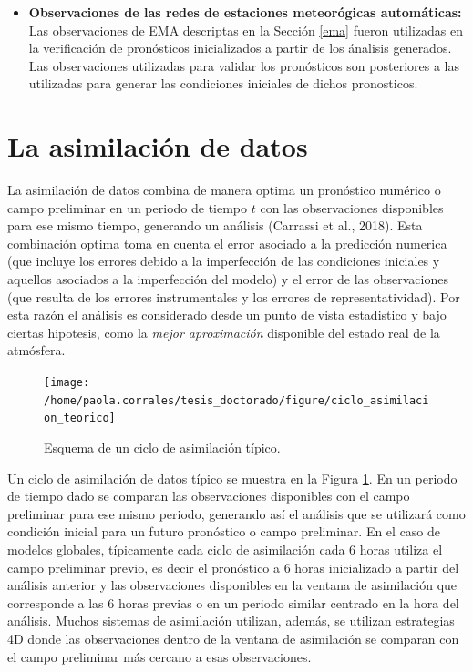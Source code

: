 \documentclass[12pt,oneside,a4paper]{reedthesis}
\begin{document}
\begin{itemize}
\item
  \textbf{Observaciones de las redes de estaciones meteorógicas automáticas:} Las observaciones de EMA descriptas en la Sección \ref{ema} fueron utilizadas en la verificación de pronósticos inicializados a partir de los ánalisis generados. Las observaciones utilizadas para validar los pronósticos son posteriores a las utilizadas para generar las condiciones iniciales de dichos pronosticos.
\end{itemize}
\hypertarget{la-asimilaciuxf3n-de-datos}{%
\section{La asimilación de datos}\label{la-asimilaciuxf3n-de-datos}}

La asimilación de datos combina de manera optima un pronóstico numérico o campo preliminar en un periodo de tiempo \(t\) con las observaciones disponibles para ese mismo tiempo, generando un análisis (Carrassi et al., 2018). Esta combinación optima toma en cuenta el error asociado a la predicción numerica (que incluye los errores debido a la imperfección de las condiciones iniciales y aquellos asociados a la imperfección del modelo) y el error de las observaciones (que resulta de los errores instrumentales y los errores de representatividad). Por esta razón el análisis es considerado desde un punto de vista estadistico y bajo ciertas hipotesis, como la \emph{mejor aproximación} disponible del estado real de la atmósfera.


\begin{figure}

{\centering \texttt{[image: /home/paola.corrales/tesis\_doctorado/figure/ciclo\_asimilacion\_teorico]} 

}

\caption{Esquema de un ciclo de asimilación típico.}\label{fig:ciclo-asimilacion-teorico}
\end{figure}
Un ciclo de asimilación de datos típico se muestra en la Figura \ref{fig:ciclo-asimilacion-teorico}. En un periodo de tiempo dado se comparan las observaciones disponibles con el campo preliminar para ese mismo periodo, generando así el análisis que se utilizará como condición inicial para un futuro pronóstico o campo preliminar. En el caso de modelos globales, típicamente cada ciclo de asimilación cada 6 horas utiliza el campo preliminar previo, es decir el pronóstico a 6 horas inicializado a partir del análisis anterior y las observaciones disponibles en la ventana de asimilación que corresponde a las 6 horas previas o en un periodo similar centrado en la hora del análisis. Muchos sistemas de asimilación utilizan, además, se utilizan estrategias 4D donde las observaciones dentro de la ventana de asimilación se comparan con el campo preliminar más cercano a esas observaciones.
\end{document}
